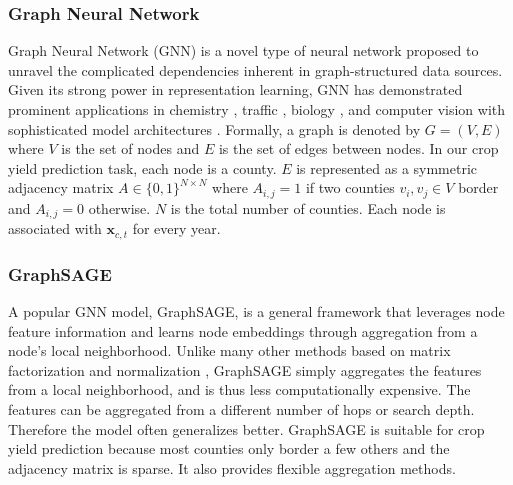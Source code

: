 \subsubsection{Graph Neural Network}
Graph Neural Network (GNN) \cite{zhou2020graph} is a novel type of neural network proposed to unravel the complicated dependencies inherent in graph-structured data sources.
Given its strong power in representation learning, GNN has demonstrated prominent applications in chemistry \cite{gilmer2017neural}, traffic \cite{cui2019traffic}, biology \cite{fout2017protein}, and computer vision \cite{satorras2018few} with sophisticated model architectures \cite{kipf2016semi,hamilton2017inductive,velivckovic2017graph}. Formally, a graph is denoted by $G=(V,E)$ where $V$ is the set of nodes and $E$ is the set of edges between nodes. In our crop yield prediction task, each node is a county. $E$ is represented as a symmetric adjacency matrix $A\in \{0,1\}^{N\times N}$ where $A_{i,j}=1$ if two counties $v_i, v_j\in V$ border and $A_{i,j}=0$ otherwise. $N$ is the total number of counties. Each node is associated with $\mathbf{x}_{c,t}$ for every year. 

\subsubsection{GraphSAGE} 
A popular GNN model, GraphSAGE, \cite{hamilton2017inductive} is a general framework that leverages node feature information and learns node embeddings through aggregation from a node's local neighborhood. Unlike many other methods based on matrix factorization and normalization \cite{jia2020residual}, GraphSAGE simply aggregates the features from a local neighborhood, and is thus less computationally expensive. The features can be aggregated from a different number of hops or search depth. Therefore the model often generalizes better. GraphSAGE is suitable for crop yield prediction because most counties only border a few others and the adjacency matrix is sparse. It also provides flexible aggregation methods.

